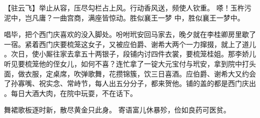 【驻云飞】举止从容，压尽勾栏占上风。行动香风送，频使人钦重。
嗏！玉杵污泥中，岂凡庸？一曲宫商，满座皆惊动。胜似襄王一梦
中，胜似襄王一梦中。

唱毕，把个西门庆喜欢的没入脚处。吩咐玳安回马家去，晚夕就在李桂卿房里歇了
一宿。紧着西门庆要梳笼这女子，又被应伯爵、谢希大两个一力撺掇，就上了道儿
。次日，使小厮往家去拿五十两银子，段铺内讨四件衣裳，要梳笼桂姐。那李娇儿
听见要梳笼他的侄女儿，如何不喜？连忙拿了一锭大元宝付与玳安，拿到院中打头
面，做衣服，定桌席，吹弹歌舞，花攒锦簇，饮三日喜酒。应伯爵、谢希大又约会
了孙寡嘴、祝实念、常峙节，每人出五分分子，都来贺他。铺的盖的都是西门庆出
。每日大酒大肉，在院中玩耍，不在话下。

舞裙歌板逐时新，散尽黄金只此身。
寄语富儿休暴殄，俭如良药可医贫。
